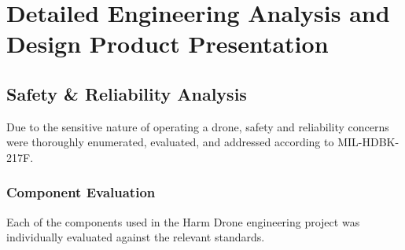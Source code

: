 \documentclass[12pt]{article}
\begin{document}
\section{Detailed Engineering Analysis and Design Product Presentation}
\subsection{Safety \& Reliability Analysis}
Due to the sensitive nature of operating a drone, safety and reliability concerns were thoroughly enumerated, evaluated, and addressed according to MIL-HDBK-217F.
\subsubsection{Component Evaluation}
Each of the components used in the Harm Drone engineering project was individually evaluated against the relevant standards. 
\end{document}

